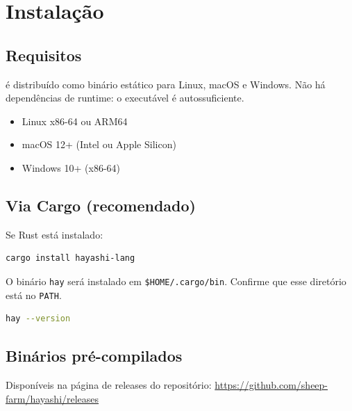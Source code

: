 \chapter{Instalação}

\section{Requisitos}

\hayashi{} é distribuído como binário estático para Linux, macOS e Windows. Não há
dependências de runtime: o executável \hay{} é autossuficiente.

\begin{itemize}
  \item Linux x86-64 ou ARM64
  \item macOS 12+ (Intel ou Apple Silicon)
  \item Windows 10+ (x86-64)
\end{itemize}

\section{Via Cargo (recomendado)}

Se Rust está instalado:

\begin{lstlisting}[style=inline, language=sh]
cargo install hayashi-lang
\end{lstlisting}

O binário \texttt{hay} será instalado em \texttt{\$HOME/.cargo/bin}. Confirme que
esse diretório está no \texttt{PATH}.

\begin{lstlisting}[style=inline, language=sh]
hay --version
\end{lstlisting}

%

\section{Binários pré-compilados}

Disponíveis na página de releases do repositório:
\url{https://github.com/sheep-farm/hayashi/releases}

